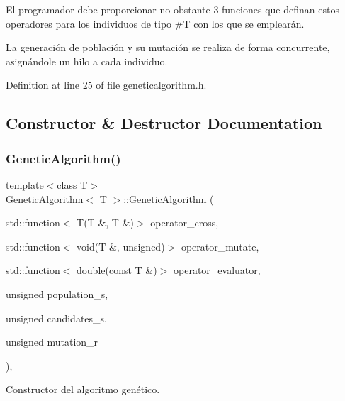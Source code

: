 El programador debe proporcionar no obstante 3 funciones que definan estos operadores para los individuos de tipo \#T con los que se emplearán.

La generación de población y su mutación se realiza de forma concurrente, asignándole un hilo a cada individuo. 

Definition at line 25 of file geneticalgorithm.\+h.



\subsection{Constructor \& Destructor Documentation}
\mbox{\label{class_genetic_algorithm_a9fda0f2f53ba15c4dc932d37eab9aff7}} 
\subsubsection{\texorpdfstring{Genetic\+Algorithm()}{GeneticAlgorithm()}}
{\footnotesize\ttfamily template$<$class T$>$ \\
\mbox{\hyperlink{class_genetic_algorithm}{Genetic\+Algorithm}}$<$ T $>$\+::\mbox{\hyperlink{class_genetic_algorithm}{Genetic\+Algorithm}} (\begin{DoxyParamCaption}\item[{std\+::function$<$ T(T \&, T \&)$>$}]{operator\+\_\+cross,  }\item[{std\+::function$<$ void(T \&, unsigned)$>$}]{operator\+\_\+mutate,  }\item[{std\+::function$<$ double(const T \&)$>$}]{operator\+\_\+evaluator,  }\item[{unsigned}]{population\+\_\+s,  }\item[{unsigned}]{candidates\+\_\+s,  }\item[{unsigned}]{mutation\+\_\+r }\end{DoxyParamCaption})\hspace{0.3cm}{\ttfamily [inline]}, {\ttfamily [explicit]}}



Constructor del algoritmo genético. 


